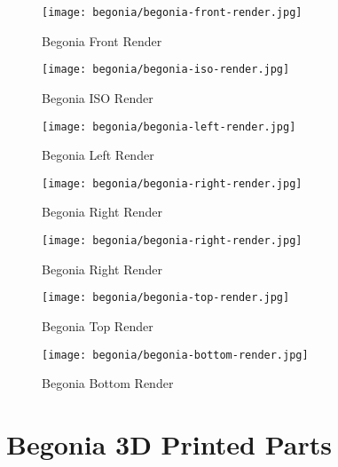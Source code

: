 \begin{figure}[H]
\centering
\texttt{[image: begonia/begonia-front-render.jpg]}
\caption{Begonia Front Render}
\label{fig:begfrontrender}
\end{figure}

\begin{figure}[H]
\centering
\texttt{[image: begonia/begonia-iso-render.jpg]}
\caption{Begonia ISO Render}
\label{fig:begisorender}
\end{figure}

\begin{figure}[H]
\centering
\texttt{[image: begonia/begonia-left-render.jpg]}
\caption{Begonia Left Render}
\label{fig:begleftrender}
\end{figure}

\begin{figure}[H]
\centering
\texttt{[image: begonia/begonia-right-render.jpg]}
\caption{Begonia Right Render}
\label{fig:begrightrender}
\end{figure}

\begin{figure}[H]
\centering
\texttt{[image: begonia/begonia-right-render.jpg]}
\caption{Begonia Right Render}
\label{fig:begrightrender}
\end{figure}

\begin{figure}[H]
\centering
\texttt{[image: begonia/begonia-top-render.jpg]}
\caption{Begonia Top Render}
\label{fig:begtoprender}
\end{figure}

\begin{figure}[H]
\centering
\texttt{[image: begonia/begonia-bottom-render.jpg]}
\caption{Begonia Bottom Render}
\label{fig:begbottomrender}
\end{figure}


\section{Begonia 3D Printed Parts}

